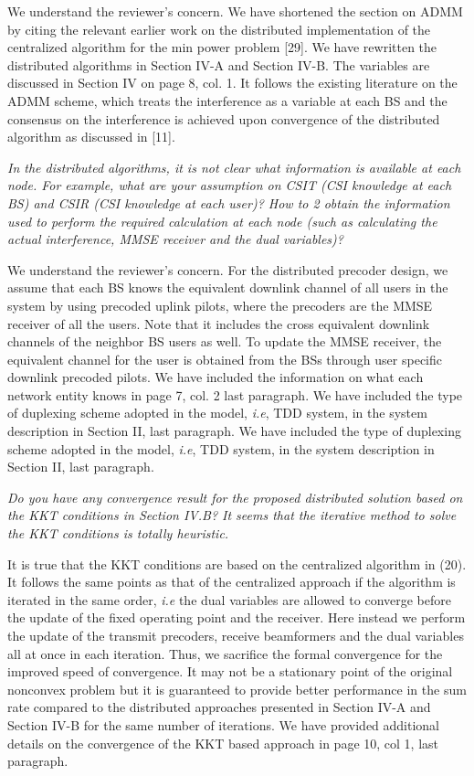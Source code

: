 \begin{itemize}
\resp We understand the reviewer's concern. We have shortened the section on ADMM by citing the relevant earlier work on the distributed implementation of the centralized algorithm for the min power problem [29]. We have rewritten the distributed algorithms in Section IV-A and Section IV-B. The variables are discussed in Section IV on page 8, col. 1. It follows the existing literature on the ADMM scheme, which treats the interference as a variable at each BS and the consensus on the interference is achieved upon convergence of the distributed algorithm as discussed in [11].

 \textit{In the distributed algorithms, it is not clear what information is available at each node. For example, what are your assumption on CSIT (CSI knowledge at each BS) and CSIR (CSI knowledge at each user)? How to 2 obtain the information used to perform the required calculation at each node (such as calculating the actual interference, MMSE receiver and the dual variables)?}

\resp We understand the reviewer's concern. For the distributed precoder design, we assume that each \ac{BS}  knows the equivalent downlink channel  of all users in the system by using precoded uplink pilots, where the precoders are the MMSE receiver of all the users. Note that it includes the cross equivalent downlink channels of the neighbor BS users as well. To update the MMSE receiver, the equivalent channel for the  user  is obtained from the BSs through user specific downlink precoded pilots. We have included the information on what each network entity knows in page 7, col. 2 last paragraph. We have included the type of duplexing scheme adopted in the model, \textit{i.e}, TDD system, in the system description in Section II, last paragraph. We have included the type of duplexing scheme adopted in the model, \textit{i.e}, TDD system, in the system description in Section II, last paragraph.

 \textit{Do you have any convergence result for the proposed distributed solution based on the KKT conditions in Section IV.B? It seems that the iterative method to solve the KKT conditions is totally heuristic.}

\resp It is true that the KKT conditions are based on the centralized algorithm in (20). It follows the same points as that of the centralized approach if the algorithm is iterated in the same order, \textit{i.e} the dual variables are allowed to converge before the update of the fixed operating point and the receiver. Here instead we perform the update of the transmit precoders, receive beamformers and the dual variables all at once in each iteration. Thus, we sacrifice the formal convergence for the improved speed of convergence. It may not be a stationary point of the original nonconvex problem but it is guaranteed to provide better performance in the sum rate compared to the distributed approaches presented in Section IV-A and Section IV-B for the same number of iterations. We have provided additional details on the convergence of the KKT based approach in page 10, col 1, last paragraph.


\end{itemize}
